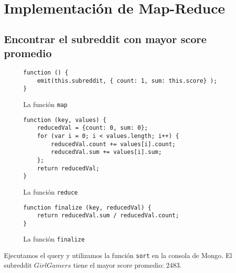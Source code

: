 \documentclass[11pt, a4paper, twoside]{article}
\begin{document}
\clearpage{\pagestyle{empty}}

\newpage


\clearpage{%
  \pagestyle{empty}\tableofcontents%
  \vspace{3cm}%
  \clearpage%
}
\setcounter{page}{1}

\section{Implementación de Map-Reduce}

\subsection{Encontrar el subreddit con mayor score promedio}

\begin{figure}[H]
\centering
\begin{verbatim}
function () {
    emit(this.subreddit, { count: 1, sum: this.score} );
}
\end{verbatim}
\caption{La función \texttt{map}}
\end{figure}

\begin{figure}[H]
\centering
\begin{verbatim}
function (key, values) {
    reducedVal = {count: 0, sum: 0};
    for (var i = 0; i < values.length; i++) {
        reducedVal.count += values[i].count;
        reducedVal.sum += values[i].sum;
    };
    return reducedVal;
}
\end{verbatim}
\caption{La función \texttt{reduce}}
\end{figure}

\begin{figure}[H]
\centering
\begin{verbatim}
function finalize (key, reducedVal) {
    return reducedVal.sum / reducedVal.count;
}
\end{verbatim}
\caption{La función \texttt{finalize}}
\end{figure}

Ejecutamos el query y utilizamos la función \texttt{sort} en la consola de Mongo. El subreddit $GirlGamers$ tiene el mayor score promedio: 2483.

\newpage
\end{document}

